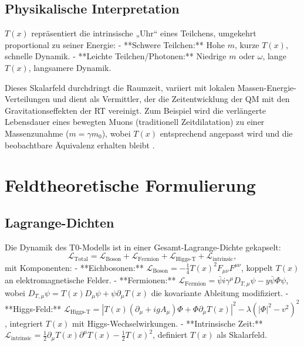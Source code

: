 \documentclass[12pt,a4paper]{article}
\newcommand{\Tfield}{T(x)}
\newcommand{\DhiggsT}{\Tfield (\partial_\mu + ig A_\mu) \Phi + \Phi \partial_\mu \Tfield}
\newcommand{\DTmu}{D_{T,\mu}}
\newcommand{\calL}{\mathcal{L}}
\begin{document}
	\subsection{Physikalische Interpretation}
	\label{subsec:time_interpretation}
	
	\(\Tfield\) repräsentiert die intrinsische „Uhr“ eines Teilchens, umgekehrt proportional zu seiner Energie:
	- **Schwere Teilchen:** Hohe \(m\), kurze \(\Tfield\), schnelle Dynamik.
	- **Leichte Teilchen/Photonen:** Niedrige \(m\) oder \(\omega\), lange \(\Tfield\), langsamere Dynamik.
	
	Dieses Skalarfeld durchdringt die Raumzeit, variiert mit lokalen Massen-Energie-Verteilungen und dient als Vermittler, der die Zeitentwicklung der QM mit den Gravitationseffekten der RT vereinigt. Zum Beispiel wird die verlängerte Lebensdauer eines bewegten Muons (traditionell Zeitdilatation) zu einer Massenzunahme (\(m = \gamma m_0\)), wobei \(\Tfield\) entsprechend angepasst wird und die beobachtbare Äquivalenz erhalten bleibt \cite{pascher_quantum_2025}.
	
	\section{Feldtheoretische Formulierung}
	\label{sec:field_theory}
	
	\subsection{Lagrange-Dichten}
	\label{subsec:lagrangian}
	
	Die Dynamik des T0-Modells ist in einer Gesamt-Lagrange-Dichte gekapselt:
	\begin{equation}
		\calL_{\text{Total}} = \calL_{\text{Boson}} + \calL_{\text{Fermion}} + \calL_{\text{Higgs-T}} + \calL_{\text{intrinsic}},
		\label{eq:total_lagrangian}
	\end{equation}
	mit Komponenten:
	- **Eichbosonen:** \(\calL_{\text{Boson}} = -\frac{1}{4}\Tfield^2 F_{\mu\nu}F^{\mu\nu}\), koppelt \(\Tfield\) an elektromagnetische Felder.
	- **Fermionen:** \(\calL_{\text{Fermion}} = \bar{\psi}i\gamma^{\mu}\DTmu\psi - y\bar{\psi}\Phi\psi\), wobei \(\DTmu\psi = \Tfield D_{\mu}\psi + \psi\partial_{\mu}\Tfield\) die kovariante Ableitung modifiziert.
	- **Higgs-Feld:** \(\calL_{\text{Higgs-T}} = |\DhiggsT|^2 - \lambda(|\Phi|^2 - v^2)^2\), integriert \(\Tfield\) mit Higgs-Wechselwirkungen.
	- **Intrinsische Zeit:** \(\calL_{\text{intrinsic}} = \frac{1}{2}\partial_{\mu}\Tfield\partial^{\mu}\Tfield - \frac{1}{2}\Tfield^2\), definiert \(\Tfield\) als Skalarfeld.
	
\end{document}

